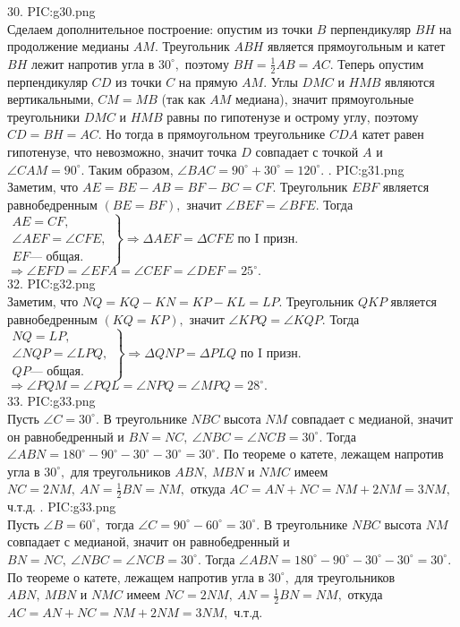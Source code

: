 30. {{PIC:g30.png}}\\
Сделаем дополнительное построение: опустим из точки $B$ перпендикуляр $BH$ на продолжение медианы $AM.$ Треугольник $ABH$ является прямоугольным и катет $BH$ лежит напротив угла в $30^\circ,$ поэтому $BH=\frac{1}{2}AB=AC.$ Теперь опустим перпендикуляр $CD$ из точки $C$ на прямую $AM.$ Углы $DMC$ и $HMB$ являются вертикальными, $CM=MB$ (так как $AM$ медиана), значит прямоугольные треугольники $DMC$ и $HMB$ равны по гипотенузе и острому углу, поэтому $CD=BH=AC.$ Но тогда в прямоугольном треугольнике $CDA$ катет равен гипотенузе, что невозможно, значит точка $D$ совпадает с точкой $A$ и $\angle CAM=90^\circ.$ Таким образом, $\angle BAC=90^\circ+30^\circ=120^\circ.$\newpage
{}. {{PIC:g31.png}}\\
Заметим, что $AE=BE-AB=BF-BC=CF.$ Треугольник $EBF$ является равнобедренным $(BE=BF),$ значит $\angle BEF=\angle BFE.$ Тогда
$\left.\begin{array}{l}AE=CF,\\
\angle AEF=\angle CFE,\\
EF\text{--- общая.}  \end{array}\right\}\Rightarrow \Delta AEF=\Delta CFE\text{ по I призн.}$\\$\Rightarrow \angle EFD=\angle EFA=\angle CEF=\angle DEF=25^\circ.$\\
32. {{PIC:g32.png}}\\
Заметим, что $NQ=KQ-KN=KP-KL=LP.$ Треугольник $QKP$ является равнобедренным $(KQ=KP),$ значит $\angle KPQ=\angle KQP.$ Тогда
$\left.\begin{array}{l}NQ=LP,\\
\angle NQP=\angle LPQ,\\
QP\text{--- общая.}  \end{array}\right\}\Rightarrow \Delta QNP=\Delta PLQ\text{ по I призн.}$\\$\Rightarrow \angle PQM=\angle PQL=\angle NPQ=\angle MPQ=28^\circ.$\\
33. {{PIC:g33.png}}\\
Пусть $\angle C=30^\circ.$ В треугольнике $NBC$ высота $NM$ совпадает с медианой, значит он равнобедренный и $BN=NC,\ \angle NBC=\angle NCB=30^\circ.$ Тогда $\angle ABN=180^\circ-90^\circ-30^\circ-30^\circ=30^\circ.$ По теореме о катете, лежащем напротив угла в $30^\circ,$ для треугольников $ABN,\ MBN$ и $NMC$ имеем $NC=2NM,\ AN=\frac{1}{2}BN=NM,$ откуда $AC=AN+NC=NM+2NM=3NM,$ ч.т.д.\newpage
{}. {{PIC:g33.png}}\\
Пусть $\angle B=60^\circ,$ тогда $\angle C=90^\circ-60^\circ=30^\circ.$ В треугольнике $NBC$ высота $NM$ совпадает с медианой, значит он равнобедренный и $BN=NC,\ \angle NBC=\angle NCB=30^\circ.$ Тогда $\angle ABN=180^\circ-90^\circ-30^\circ-30^\circ=30^\circ.$ По теореме о катете, лежащем напротив угла в $30^\circ,$ для треугольников $ABN,\ MBN$ и $NMC$ имеем $NC=2NM,\ AN=\frac{1}{2}BN=NM,$ откуда $AC=AN+NC=NM+2NM=3NM,$ ч.т.д.\\
